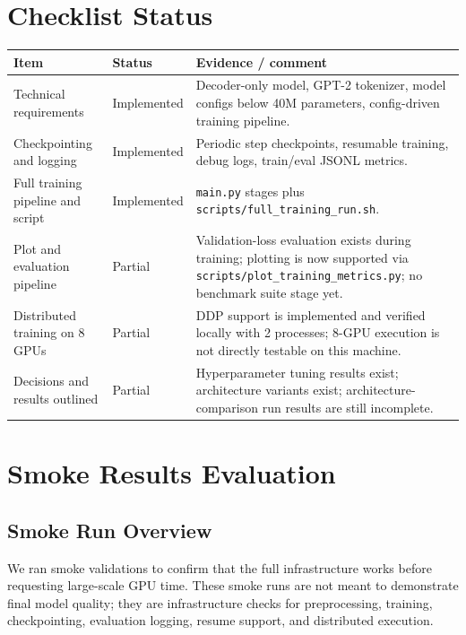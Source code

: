 \documentclass[11pt]{article}
\newcommand{\ok}{\textcolor{green!50!black}{Implemented}}
\newcommand{\partialstatus}{\textcolor{orange!85!black}{Partial}}
\begin{document}
\section*{Checklist Status}
\begin{table}[H]
\centering
\small
\begin{tabularx}{\textwidth}{>{\raggedright\arraybackslash}p{} >{\raggedright\arraybackslash}p{} X}
\toprule
Item & Status & Evidence / comment \\
\midrule
Technical requirements & \ok & Decoder-only model, GPT-2 tokenizer, model configs below 40M parameters, config-driven training pipeline. \\
Checkpointing and logging & \ok & Periodic step checkpoints, resumable training, debug logs, train/eval JSONL metrics. \\
Full training pipeline and script & \ok & \texttt{main.py} stages plus \texttt{scripts/full\_training\_run.sh}. \\
Plot and evaluation pipeline & \partialstatus & Validation-loss evaluation exists during training; plotting is now supported via \texttt{scripts/plot\_training\_metrics.py}; no benchmark suite stage yet. \\
Distributed training on 8 GPUs & \partialstatus & DDP support is implemented and verified locally with 2 processes; 8-GPU execution is not directly testable on this machine. \\
Decisions and results outlined & \partialstatus & Hyperparameter tuning results exist; architecture variants exist; architecture-comparison run results are still incomplete. \\
\bottomrule
\end{tabularx}
\end{table}

\section*{Smoke Results Evaluation}

\subsection*{Smoke Run Overview}
We ran smoke validations to confirm that the full infrastructure works before requesting large-scale GPU time. These smoke runs are not meant to demonstrate final model quality; they are infrastructure checks for preprocessing, training, checkpointing, evaluation logging, resume support, and distributed execution.
\end{document}
